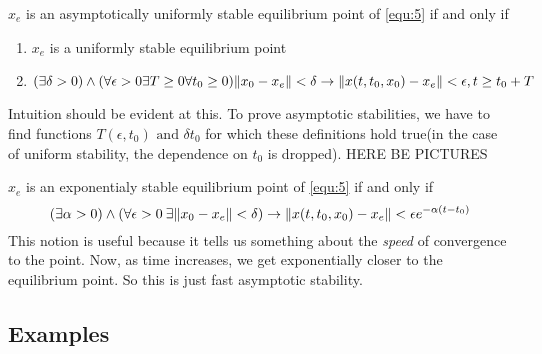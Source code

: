{
    $x_e$ is an asymptotically uniformly stable equilibrium point of  \ref{equ:5} if and only if \\
    \begin{enumerate}
        \item $x_e$ is a uniformly stable equilibrium point
        \item 
             \begin{equation}
                \label{dfn:austab_eq_pt}
                (\exists \delta > 0 ) \wedge (\forall \epsilon > 0 \exists T \ge 0 \forall t_0 \ge  0) \lVert x_0 - x_e\rVert < \delta \rightarrow  \lVert x(t,t_0,x_0) - x_e\rVert < \epsilon, t \ge t_0+T
            \end{equation}
    \end{enumerate}
    Intuition should be evident at this.
    \nt
    {To prove asymptotic stabilities, we have to find functions $T(\epsilon, t_0)\text{ and } \delta{t_0}$ for which these definitions hold true(in the case of uniform stability, the dependence on $t_0$ is dropped). 
    HERE BE PICTURES
    }

}

{

    $x_e$ is an exponentialy stable equilibrium point of  \ref{equ:5} if and only if \\
    \begin{equation}
        \label{dfn:estab_eq_pt}
        (\exists \alpha > 0 ) \wedge (\forall \epsilon > 0 \: \exists  \lVert x_0-x_e\rVert < \delta) \rightarrow \lVert x(t,t_0,x_0) - x_e\rVert < \epsilon e^{-\alpha(t-t_0)}
    \end{equation}
    This notion is useful because it tells us something about the \textit{speed} of convergence to the point. Now, as time increases, we get exponentially
    closer to the equilibrium point. So this is just fast asymptotic stability.
}
\subsection{Examples}

